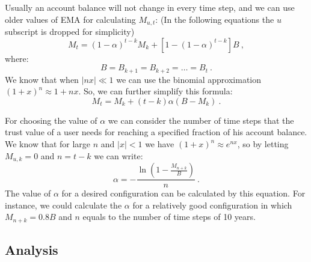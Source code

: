 Usually an account balance will not change in every time step, and we can use older values of EMA for calculating
\(M_{u,t}\): (In the following equations the \(u\) subscript is dropped for simplicity)
\[
    M_{t} = (1 - \alpha)^{t-k}M_{k} + [1 - (1 - \alpha)^{t - k}]B\ ,
\]
where:
\[
    B = B_{k+1} = B_{k+2} = \dots = B_{t}\ .
\]
We know that when \(|nx| \ll 1\) we can use the binomial approximation \({(1 + x)^n \approx 1 + nx}\). So, we can
further simplify this formula:
\[
    M_{t} = M_{k} + (t - k) \alpha (B - M_{k})\ .
\]

For choosing the value of \(\alpha\) we can consider the number of time steps that the trust value of a user needs
for reaching a specified fraction of his account balance. We know that for large \(n\) and \(|x| < 1\) we have
\((1 + x)^n \approx e^{nx}\), so by letting \(M_{u,k} = 0\) and \(n = t - k\) we can write:
\begin{equation}
    \alpha =- \frac{\ln\left(1 - \frac{M_{n+k}}{B}\right)}{n}\ .\label{eq:alpha}
\end{equation}
The value of \(\alpha\) for a desired configuration can be calculated by this equation. For instance, we could
calculate the \(\alpha\) for a relatively good configuration in which \(M_{n+k} = 0.8B\) and \(n\) equals to the
number of time steps of 10 years.

\subsection{Analysis}\label{subsec:consensus-math}
